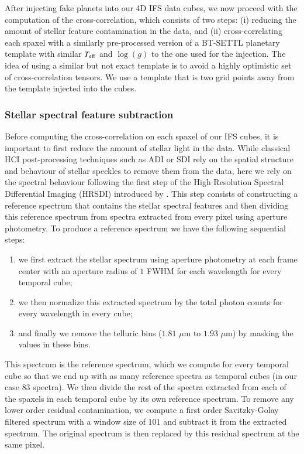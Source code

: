 \documentclass{aa}
\begin{document}
After injecting fake planets into our 4D IFS data cubes, we now proceed with the computation of the cross-correlation, which consists of two steps: (i) reducing the amount of stellar feature contamination in the data, and (ii) cross-correlating each spaxel with a similarly pre-processed version of a BT-SETTL planetary template with similar $T_{\rm eff}$ and $\log(g)$ to the one used for the injection.
The idea of using a similar but not exact template is to avoid a highly optimistic set of cross-correlation tensors.
We use a template that is two grid points away from the template injected into the cubes.

\subsubsection{Stellar spectral feature subtraction}

Before computing the cross-correlation on each spaxel of our IFS cubes, it is important to first reduce the amount of stellar light in the data. 
While classical HCI post-processing techniques such as ADI or SDI rely on the spatial structure and behaviour of stellar speckles to remove them from the data, here we rely on the spectral behaviour following the first step of the High Resolution Spectral Differential Imaging (HRSDI) introduced by \citet{2019Haffert}. 
This step consists of constructing a reference spectrum that contains the stellar spectral features and then dividing \citep[or subtracting, in the case of][]{2019Haffert} this reference spectrum from spectra extracted from every pixel using aperture photometry. 
To produce a reference spectrum we have the following sequential steps:
\begin{enumerate}
    \item we first extract the stellar spectrum using aperture photometry at each frame center with an aperture radius of $1$ FWHM for each wavelength for every temporal cube;
    \item we then normalize this extracted spectrum by the total photon counts for every wavelength in every cube;
    \item and finally we remove the telluric bins ($1.81$ $\mu$m to $1.93$ $\mu$m) by masking the values in these bins.
\end{enumerate}
This spectrum is the reference spectrum, which we compute for every temporal cube so that we end up with as many reference spectra as temporal cubes (in our case $83$ spectra).
We then divide the rest of the spectra extracted from each of the spaxels in each temporal cube by its own reference spectrum.
To remove any lower order residual contamination, we compute a first order Savitzky-Golay filtered spectrum with a window size of $101$ and subtract it from the extracted spectrum. The original spectrum is then replaced by this residual spectrum at the same pixel.
\end{document}
